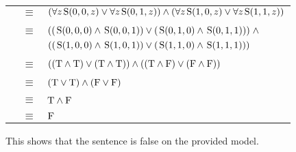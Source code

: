 \documentclass{article}
\newcommand{\True}{\textnormal{T}}
\newcommand{\False}{\textnormal{F}}
\newcommand{\predS}{\hspace{0.05cm} \textnormal{S}}
\begin{document}
\begin{enumerate}
{\begin{center}
\begin{tabular}{ccl}
    & $\equiv$ & $(\forall z \predS(0,0,z) \lor \forall z \predS(0,1,z)) \land (\forall z \predS(1,0,z) \lor \forall z \predS(1,1,z))$ \\ \\
    
    & $\equiv$ & $((\predS(0,0,0) \land \predS(0,0,1)) \lor (\predS(0,1,0) \land \predS(0,1,1))) \hspace{0.1cm} \land$ \\
    & & $((\predS(1,0,0) \land \predS(1,0,1)) \lor (\predS(1,1,0) \land \predS(1,1,1)))$ \\ \\
    
    & $\equiv$ & $((\True \land \True) \lor (\True \land \True)) \land ((\True \land \False) \lor (\False \land \False))$ \\ \\
    
    & $\equiv$ & $(\True \lor \True) \land (\False \lor \False)$ \\ \\
    
    & $\equiv$ & $\True \land \False$ \\ \\
    
    & $\equiv$ & $\False$ \\ 
    \end{tabular}\end{center}
    This shows that the sentence is false on the provided model.
    }

    \pagebreak


\end{enumerate}
\end{document}
